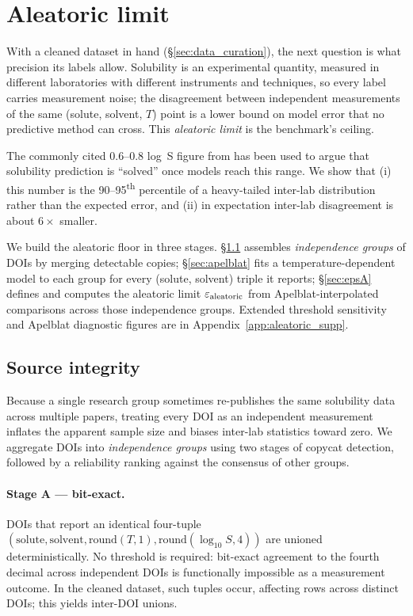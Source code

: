 \section{Aleatoric limit}
\label{sec:aleatoric}

With a cleaned dataset in hand (§\ref{sec:data_curation}), the next
question is what precision its labels allow.  Solubility is an
experimental quantity, measured in different laboratories with
different instruments and techniques, so every label carries measurement noise; the
disagreement between independent measurements of the same
(solute, solvent, $T$) point is a lower bound on model error that no
predictive method can cross.  This \emph{aleatoric limit} is the
benchmark's ceiling.

The commonly cited $0.6$--$0.8$ log~S figure from
\citet{palmer2014dataquality} has been used to argue that
solubility prediction is ``solved'' once models reach this range.  We
show that (i) this number is the 90--95\textsuperscript{th} percentile
of a heavy-tailed inter-lab distribution rather than the expected
error, and (ii) in expectation inter-lab disagreement is about
$6\times$ smaller.

We build the aleatoric floor in three stages.  §\ref{sec:source}
assembles \emph{independence groups} of DOIs by merging detectable
copies; §\ref{sec:apelblat} fits a temperature-dependent model to each
group for every (solute, solvent) triple it reports; §\ref{sec:epsA}
defines and computes the aleatoric limit $\varepsilon_{\text{aleatoric}}$ from
Apelblat-interpolated comparisons across those independence groups.
Extended threshold sensitivity and Apelblat diagnostic figures are in Appendix~\ref{app:aleatoric_supp}.

\subsection{Source integrity}
\label{sec:source}

Because a single research group sometimes re-publishes the same
solubility data across multiple papers, treating every DOI as an
independent measurement inflates the apparent sample size and biases
inter-lab statistics toward zero.  We aggregate DOIs into
\emph{independence groups} using two stages of copycat detection,
followed by a reliability ranking against the consensus of other groups.

\paragraph{Stage A — bit-exact.}
DOIs that report an identical four-tuple
$(\mathrm{solute},\mathrm{solvent},\mathrm{round}(T,1),\mathrm{round}(\log_{10} S, 4))$
are unioned deterministically.  No threshold is required: bit-exact
agreement to the fourth decimal across independent DOIs is functionally
impossible as a measurement outcome.  In the cleaned dataset,
 such tuples occur, affecting  rows across
 distinct DOIs; this yields  inter-DOI unions.

